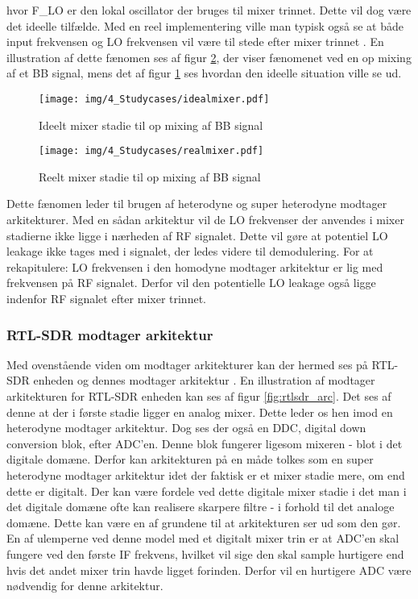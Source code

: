 \begin{appendices}
hvor F\_LO er den lokal oscillator der bruges til mixer trinnet. Dette vil dog være det ideelle tilfælde. Med en reel implementering ville man typisk også se at både input frekvensen og LO frekvensen vil være til stede efter mixer trinnet \cite{lo-leakage}. En illustration af dette fænomen ses af figur \ref{fig:realmixer}, der viser fænomenet ved en op mixing af et BB signal, mens det af figur \ref{fig:idealmixer} ses hvordan den ideelle situation ville se ud.

\begin{figure}[H]
	\centering{}
	\texttt{[image: img/4\_Studycases/idealmixer.pdf]}
	\caption{Ideelt mixer stadie til op mixing af BB signal}
	\label{fig:idealmixer}
\end{figure} 

\begin{figure}[H]
	\centering{}
	\texttt{[image: img/4\_Studycases/realmixer.pdf]}
	\caption{Reelt mixer stadie til op mixing af BB signal}
	\label{fig:realmixer}
\end{figure} 

Dette fænomen leder til brugen af heterodyne og super heterodyne modtager arkitekturer. Med en sådan arkitektur vil de LO frekvenser der anvendes i mixer stadierne ikke ligge i nærheden af RF signalet. Dette vil gøre at potentiel LO leakage ikke tages med i signalet, der ledes videre til demodulering. For at rekapitulere: LO frekvensen i den homodyne modtager arkitektur er lig med frekvensen på RF signalet. Derfor vil den potentielle LO leakage også ligge indenfor RF signalet efter mixer trinnet. 

\pagebreak
\subsubsection{RTL-SDR modtager arkitektur}
Med ovenstående viden om modtager arkitekturer kan der hermed ses på RTL-SDR enheden og dennes modtager arkitektur \cite{rtlsdr-architecture}. En illustration af modtager arkitekturen for RTL-SDR enheden kan ses af figur \ref{fig:rtlsdr_arc}. Det ses af denne at der i første stadie ligger en analog mixer. Dette leder os hen imod en heterodyne modtager arkitektur. Dog ses der også en DDC, digital down conversion blok, efter ADC'en. Denne blok fungerer ligesom mixeren - blot i det digitale domæne. Derfor kan arkitekturen på en måde tolkes som en super heterodyne modtager arkitektur idet der faktisk er et mixer stadie mere, om end dette er digitalt. Der kan være fordele ved dette digitale mixer stadie i det man i det digitale domæne ofte kan realisere skarpere filtre - i forhold til det analoge domæne. Dette kan være en af grundene til at arkitekturen ser ud som den gør. En af ulemperne ved denne model med et digitalt mixer trin er at ADC'en skal fungere ved den første IF frekvens, hvilket vil sige den skal sample hurtigere end hvis det andet mixer trin havde ligget forinden. Derfor vil en hurtigere ADC være nødvendig for denne arkitektur. 


\end{appendices}
